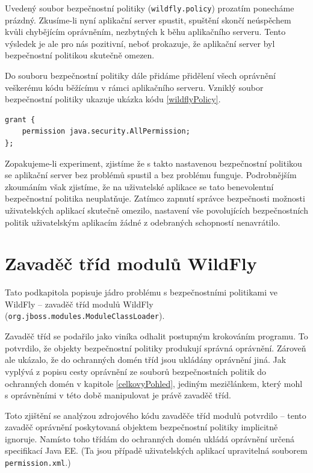 Uvedený soubor bezpečnostní politiky ({\tt wildfly.policy}) prozatím ponecháme prázdný.
Zkusíme-li nyní aplikační server spustit, spuštění skončí neúspěchem kvůli chybějícím oprávněním, nezbytných k běhu aplikačního serveru. Tento výsledek je ale pro nás pozitivní, neboť prokazuje, že aplikační server byl bezpečnostní politikou skutečně omezen.

Do souboru bezpečnostní politiky dále přidáme přidělení všech oprávnění veškerému kódu běžícímu v rámci aplikačního serveru. Vzniklý soubor bezpečnostní politiky ukazuje ukázka kódu \ref{wildflyPolicy}.

\begin{lstlisting}[caption=První testovací soubor bezpečnostní politiky, label=wildflyPolicy]
grant {
    permission java.security.AllPermission;
};
\end{lstlisting}

Zopakujeme-li experiment, zjistíme že s takto nastavenou bezpečnostní politikou se aplikační server bez problémů spustil a bez problému funguje.
Podrobnějším zkoumáním však zjistíme, že na uživatelské aplikace se tato benevolentní bezpečnostní politika neuplatňuje.
Zatímco zapnutí správce bezpečnosti možnosti uživatelských aplikací skutečně omezilo, nastavení vše povolujících bezpečnostních politik uživatelským
aplikacím žádné z odebraných schopností nenavrátilo.

\section{Zavaděč tříd modulů WildFly} \label{moduleClassLoader}

Tato podkapitola popisuje jádro problému s bezpečnostními politikami ve WildFly -- zavaděč tříd modulů WildFly ({\tt org.jboss.modules.ModuleClassLoader}).

Zavaděč tříd se podařilo jako viníka odhalit postupným krokováním programu.
To potvrdilo, že objekty bezpečnostní politiky produkují správná oprávnění.
Zároveň ale ukázalo, že do ochranných domén tříd jsou ukládány oprávnění jiná.
Jak vyplývá z popisu cesty oprávnění ze souborů bezpečnostních politik do ochranných domén v kapitole \ref{celkovyPohled},
jediným mezičlánkem, který mohl s oprávněními v této době manipulovat je právě zavaděč tříd.

Toto zjištění se analýzou zdrojového kódu zavaděče tříd modulů potvrdilo -- tento zavaděč oprávnění poskytovaná objektem bezpečnostní politiky implicitně ignoruje.
Namísto toho třídám do ochranných domén ukládá oprávnění určená specifikací Java EE. \cite{javaEEspec}
(Ta jsou případě uživatelských aplikací upravitelná souborem {\tt permission.xml}.)

